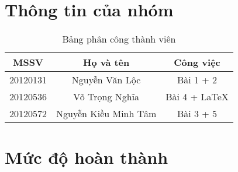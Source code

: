 \section{Thông tin của nhóm}
\begin{table}[H]
\begin{center}
\begin{tabular}{|c|c|c|}
\hline 
MSSV & Họ và tên & Công việc \\ 
\hline 
20120131 & Nguyễn Văn Lộc & Bài 1 + 2 \\ 
\hline 
20120536 & Võ Trọng Nghĩa & Bài 4 + \LaTeX \\ 
\hline 
20120572 & Nguyễn Kiều Minh Tâm & Bài 3 + 5 \\ 
\hline 
\end{tabular}
\caption{Bảng phân công thành viên} 
\end{center}
\end{table}

\section{Mức độ hoàn thành}